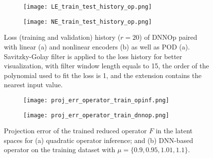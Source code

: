 \begin{figure}[!htb]
     \begin{center}
        \begin{subfigure}[b]{0.49\textwidth}
            \begin{center}
            \texttt{[image: LE\_train\_test\_history\_op.png]}
            \end{center}
            \caption{}
        \end{subfigure}
        \begin{subfigure}[b]{0.49\textwidth}
           \begin{center}
            \texttt{[image: NE\_train\_test\_history\_op.png]}
           \end{center}
            \caption{}
        \end{subfigure}
     \end{center}
        \caption[Loss history ($r = 20$) of DNNOp paired with autoencoders.]{Loss (training and validation) history ($r = 20$) of DNNOp paired with linear (a) and nonlinear encoders (b) as well as POD (a). Savitzky-Golay filter is applied to the loss history for better visualization, with filter window length equals to 15, the order of the polynomial used to fit the loss is 1, and the extension contains the nearest input value.}
        \label{fig: ML op train test history}
\end{figure}

\begin{figure}[!htb]
     \begin{center}
        \begin{subfigure}[b]{0.49\textwidth}
            \begin{center}
            \texttt{[image: proj\_err\_operator\_train\_opinf.png]}
            \end{center}
            \caption{}
        \end{subfigure}
        \begin{subfigure}[b]{0.49\textwidth}
            \begin{center}
           \texttt{[image: proj\_err\_operator\_train\_dnnop.png]}
            \end{center}
            \caption{}
        \end{subfigure}
     \end{center}
        \caption[Projection error of the trained reduced operators.]{Projection error of the trained reduced operator $F$ in the latent spaces for (a) quadratic operator inference; and (b) DNN-based operator on the training dataset with $\mu = \{0.9, 0.95, 1.01, 1.1\}$.}
        \label{fig: operator projection error}
\end{figure}

